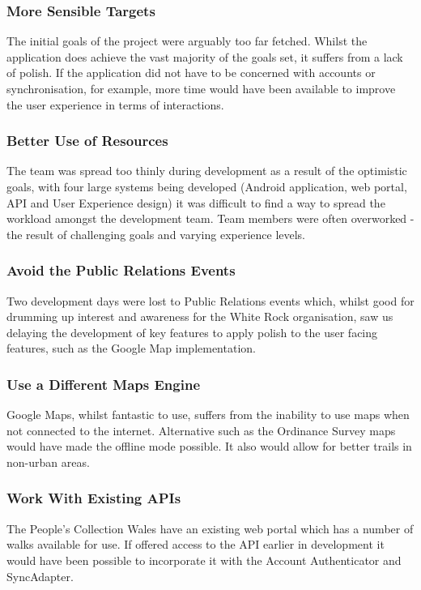 \documentclass[11pt,a4paper]{report}
\begin{document}
\subsubsection{More Sensible Targets}
The initial goals of the project were arguably too far fetched. Whilst the application does achieve the vast majority of the goals set, it suffers from a lack of polish. If the application did not have to be concerned with accounts or synchronisation, for example, more time would have been available to improve the user experience in terms of interactions.

\subsubsection{Better Use of Resources}
The team was spread too thinly during development as a result of the optimistic goals, with four large systems being developed (Android application, web portal, API and User Experience design) it was difficult to find a way to spread the workload amongst the development team. Team members were often overworked - the result of challenging goals and varying experience levels.

\subsubsection{Avoid the Public Relations Events}
Two development days were lost to Public Relations events which, whilst good for drumming up interest and awareness for the White Rock organisation, saw us delaying the development of key features to apply polish to the user facing features, such as the Google Map implementation. 

\subsubsection{Use a Different Maps Engine}
Google Maps, whilst fantastic to use, suffers from the inability to use maps when not connected to the internet. Alternative such as the Ordinance Survey maps would have made the offline mode possible. It also would allow for better trails in non-urban areas.

\subsubsection{Work With Existing APIs}
The People's Collection Wales have an existing web portal which has a number of walks available for use. If offered access to the API earlier in development it would have been possible to incorporate it with the Account Authenticator and SyncAdapter.
\end{document}
